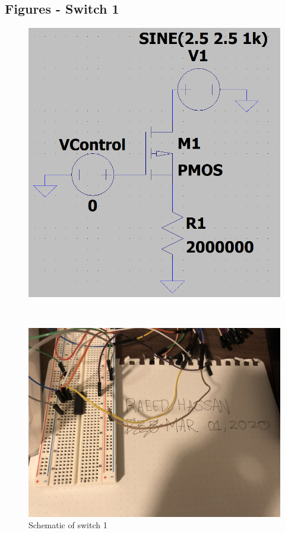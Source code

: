 \documentclass[12pt]{article}
\begin{document}
\pagebreak
\begin{landscape}
    \pagestyle{lscapedplain}
    \appendix
    \section{Figures - Switch 1}
    \begin{figure}[ht!]
        \begin{minipage}[b]{0.33\linewidth}
            \centering
            \includegraphics[width=0.7\linewidth]{images/S1Schematic.png} 
            \caption{Schematic of switch 1} 
            \vspace{4ex}
        \end{minipage}%
        ~
        \begin{minipage}[b]{0.33\linewidth}
            \centering
            \includegraphics[width=\linewidth]{images/Switch1Circuit.png} 

\end{minipage}
\end{figure}
\end{landscape}
\end{document}
